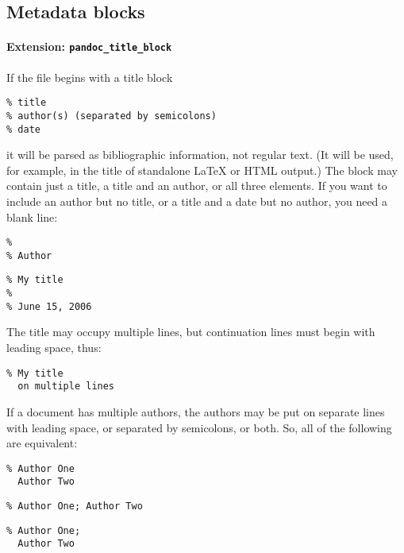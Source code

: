 \hypertarget{metadata-blocks}{%
\subsection{Metadata blocks}\label{metadata-blocks}}

\hypertarget{extension-pandoc_title_block}{%
\paragraph{\texorpdfstring{Extension:
\texttt{pandoc\_title\_block}}{Extension: pandoc\_title\_block}}\label{extension-pandoc_title_block}}

If the file begins with a title block

\begin{verbatim}
% title
% author(s) (separated by semicolons)
% date
\end{verbatim}

it will be parsed as bibliographic information, not regular text. (It
will be used, for example, in the title of standalone LaTeX or HTML
output.) The block may contain just a title, a title and an author, or
all three elements. If you want to include an author but no title, or a
title and a date but no author, you need a blank line:

\begin{verbatim}
%
% Author
\end{verbatim}

\begin{verbatim}
% My title
%
% June 15, 2006
\end{verbatim}

The title may occupy multiple lines, but continuation lines must begin
with leading space, thus:

\begin{verbatim}
% My title
  on multiple lines
\end{verbatim}

If a document has multiple authors, the authors may be put on separate
lines with leading space, or separated by semicolons, or both. So, all
of the following are equivalent:

\begin{verbatim}
% Author One
  Author Two
\end{verbatim}

\begin{verbatim}
% Author One; Author Two
\end{verbatim}

\begin{verbatim}
% Author One;
  Author Two
\end{verbatim}


